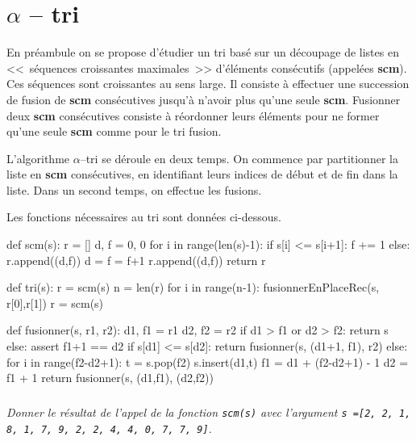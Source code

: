 \documentclass[10pt,fleqn]{article} %
\begin{document}

\vspace{2cm}
\pagestyle{fancy}
\thispagestyle{plain}

\section*{$\alpha$ -- tri}
En préambule on se propose d'étudier un tri basé sur un découpage de listes en <<~séquences croissantes maximales~>> d'éléments consécutifs (appelées \textbf{scm}). Ces séquences sont croissantes au sens large.  Il consiste à effectuer une succession de fusion de \textbf{scm} consécutives jusqu'à n'avoir plus qu'une seule \textbf{scm}. Fusionner deux \textbf{scm} consécutives consiste à réordonner leurs éléments pour ne former qu'une seule \textbf{scm} comme pour le tri fusion. 

L'algorithme $\alpha$--tri se déroule en deux temps. On commence par partitionner la liste en \textbf{scm}
consécutives, en identifiant leurs indices de début et de fin dans la liste. Dans un second temps,
on effectue les fusions.

Les fonctions nécessaires au tri sont données ci-dessous.

\begin{py}
\begin{minipage}[c]{.45\linewidth}

\begin{python}
def scm(s):
    r = []
    d, f = 0, 0
    for i in range(len(s)-1):
        if s[i] <= s[i+1]:
            f += 1
        else:
            r.append((d,f))
            d = f = f+1
    r.append((d,f))
    return r
    
def tri(s):
    r = scm(s)
    n = len(r)
    for i in range(n-1):
        fusionnerEnPlaceRec(s, r[0],r[1])
        r = scm(s)
\end{python}

\end{minipage} \hfill
\begin{minipage}[c]{.45\linewidth}

\begin{python}
def fusionner(s, r1, r2):
    d1, f1 = r1
    d2, f2 = r2
    if d1 > f1 or d2 > f2:
        return s
    else:
        assert f1+1 == d2
        if s[d1] <= s[d2]:
            return fusionner(s, (d1+1, f1), r2)
        else:
            for i in range(f2-d2+1):
                t = s.pop(f2) 
                s.insert(d1,t) 
            f1 = d1 + (f2-d2+1) - 1
            d2 = f1 + 1
            return fusionner(s, (d1,f1), (d2,f2))
\end{python}
\end{minipage}
\end{py}
\subparagraph{}
\textit{Donner le résultat de l'appel de la fonction \texttt{scm(s)} avec l'argument \texttt{s =[2, 2, 1, 8, 1, 7, 9, 2, 2, 4, 4, 0, 7, 7, 9]}.}
\end{document}
